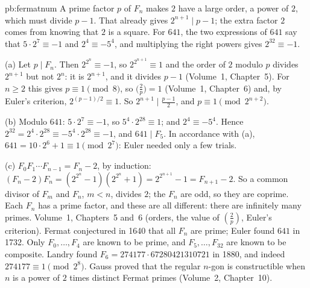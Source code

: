 \begin{solution}{pb:fermatnum}
\idea A prime factor $p$ of $F_n$ makes $2$ have a large order, a power of $2$, which must divide $p-1$. That already gives
$2^{n+1}\mid p-1$; the extra factor $2$ comes from knowing that $2$ is a square. For $641$, the two expressions of $641$ say
that $5\cdot2^7\equiv-1$ and $2^4\equiv-5^4$, and multiplying the right powers gives $2^{32}\equiv-1$.

\writeup (a) Let $p\mid F_n$. Then $2^{2^n}\equiv-1$, so $2^{2^{n+1}}\equiv1$ and the order of $2$ modulo $p$ divides $2^{n+1}$ but
not $2^n$: it is $2^{n+1}$, and it divides $p-1$ (Volume~1, Chapter~5). For $n\ge2$ this gives $p\equiv1\pmod8$, so
$\bigl(\frac2p\bigr)=1$ (Volume~1, Chapter~6) and, by Euler's criterion, $2^{(p-1)/2}\equiv1$. So $2^{n+1}\mid\frac{p-1}2$, and
$p\equiv1\pmod{2^{n+2}}$.

(b) Modulo $641$: $5\cdot2^7\equiv-1$, so $5^4\cdot2^{28}\equiv1$; and $2^4\equiv-5^4$. Hence
$2^{32}=2^4\cdot2^{28}\equiv-5^4\cdot2^{28}\equiv-1$, and $641\mid F_5$. In accordance with (a), $641=10\cdot2^6+1\equiv1\pmod{2^7}$: Euler
needed only a few trials.

(c) $F_0F_1\cdots F_{n-1}=F_n-2$, by induction: $(F_n-2)F_n=(2^{2^n}-1)(2^{2^n}+1)=2^{2^{n+1}}-1=F_{n+1}-2$. So a common divisor
of $F_m$ and $F_n$, $m<n$, divides $2$; the $F_n$ are odd, so they are coprime. Each $F_n$ has a prime factor, and these are
all different: there are infinitely many primes.
\tools Volume~1, Chapters~5 and~6 (orders, the value of $(\frac2p)$, Euler's criterion).
\leads Fermat conjectured in 1640 that all $F_n$ are prime; Euler found $641$ in 1732. Only $F_0,\dots,F_4$ are known to be prime,
and $F_5,\dots,F_{32}$ are known to be composite. Landry found $F_6=274177\cdot67280421310721$ in 1880, and indeed
$274177\equiv1\pmod{2^8}$. Gauss proved that the regular $n$-gon is constructible when $n$ is a power of $2$ times distinct Fermat
primes (Volume~2, Chapter~10).
\end{solution}


